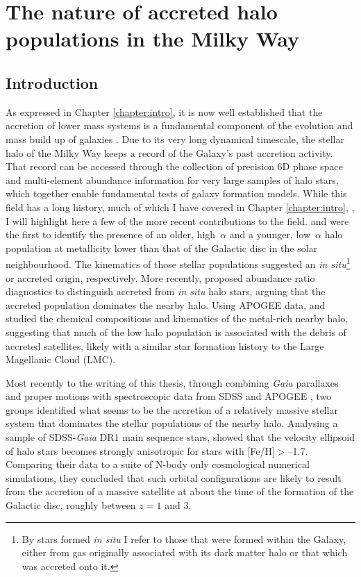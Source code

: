\chapter{The nature of accreted halo populations in the Milky Way}
\label{chapter:highe}
\section{Introduction} \label{intro}

As expressed in Chapter \ref{chapter:intro}, it is now well established that the accretion of lower mass systems is a fundamental component of the evolution and mass build up of galaxies \citep{1991ApJ...379...52W}.  Due to its very long dynamical
timescale, the stellar halo of the Milky Way keeps a record of the
Galaxy's past accretion activity.  That record can be accessed
through the collection of precision 6D phase space and multi-element
abundance information for very large samples of halo stars, which
together enable fundamental tests of galaxy formation models.  While
this field has a long history, much of which I have covered in Chapter \ref{chapter:intro}, 
\citep[e.g.,][]{1962ApJ...136..748E,1978ApJ...225..357S}, I will highlight here a few of the more recent contributions to the field.  \citet{2010A&A...511L..10N} and \citet{2012A&A...538A..21S}
were the first to identify the presence of an older, high~$\alpha$
and a younger, low~$\alpha$ halo population at metallicity lower
than that of the Galactic disc in the solar neighbourhood.
The kinematics of those stellar populations suggested an {\it in
situ}\footnote{ By stars formed {\it in situ} I refer to those
that were formed within the Galaxy, either from gas originally
associated with its dark matter halo or that which was accreted
onto it.} or accreted origin, respectively. More
recently, \citet{2015MNRAS.453..758H} proposed abundance ratio
diagnostics to distinguish accreted from {\it in situ} halo stars,
arguing that the accreted population dominates the nearby halo.
Using APOGEE data, \citet{2018ApJ...852...50F} and
\citet{2018ApJ...852...49H} studied the chemical compositions and
kinematics of the metal-rich nearby halo, suggesting that much of
the low \mgfe{} halo population is associated with the debris of
accreted satellites, likely with a similar star formation history
to the Large Magellanic Cloud (LMC).


Most recently to the writing of this thesis, through combining \emph{Gaia} parallaxes and proper motions
\citep{2016arXiv160904303L,2018arXiv180409365G} with spectroscopic
data from SDSS \citep{2000AJ....120.1579Y} and APOGEE
\citep{2015arXiv150905420M}, two groups identified what seems
to be the accretion of a relatively massive stellar system that
dominates the stellar populations of the nearby halo.  Analysing a
sample of SDSS-\emph{Gaia} DR1 main sequence stars,
\citet{2018MNRAS.478..611B} showed that the velocity ellipsoid of
halo stars becomes strongly anisotropic for stars with [Fe/H]$>$--1.7.
Comparing their data to a suite of N-body only cosmological
numerical simulations, they concluded that such orbital configurations
are likely to result from the accretion of a massive satellite at
about the time of the formation of the Galactic disc, roughly between
$z=1$ and 3.

